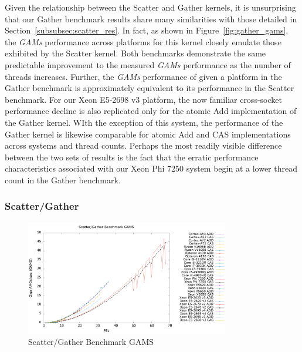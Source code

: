 Given the relationship between the Scatter and Gather kernels, it is unsurprising that our Gather benchmark results share many similarities with those detailed in Section~\ref{subsubsec:scatter_res}.
In fact, as shown in Figure~\ref{fig:gather_gams}, the \textit{GAMs} performance across platforms for this kernel closely emulate those exhibited by the Scatter kernel.
Both benchmarks demonstrate the same predictable improvement to the measured \textit{GAMs} performance as the number of threads increases.
Further, the \textit{GAMs} performance of given a platform in the Gather benchmark is approximately equivalent to its performance in the Scatter benchmark.
For our Xeon E5-2698 v3 platform, the now familiar cross-socket performance decline is also replicated only for the atomic Add implementation of the Gather kernel.
WIth the exception of this system, the performance of the Gather kernel is likewise comparable for atomic Add and CAS implementations across systems and thread counts. 
Perhaps the most readily visible difference between the two sets of results is the fact that the erratic performance characteristics associated with our Xeon Phi 7250 system begin at a lower thread count in the Gather benchmark.

\subsubsection{Scatter/Gather}
\label{subsubsec:sg_res}

\begin{figure}[!t]
\centering
\includegraphics[width=3.5in]{figures/SG_GAMS.png}
\caption{Scatter/Gather Benchmark GAMS}
\label{fig:sg_gams}
\end{figure}

